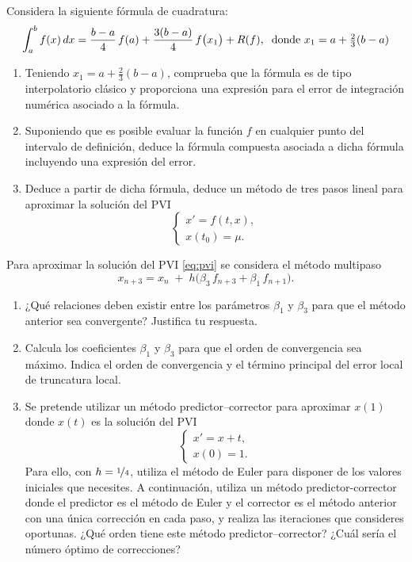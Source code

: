\documentclass[12pt]{article}
\begin{document}
  \begin{ejercicio}[3 puntos] Considera la siguiente fórmula de cuadratura:
    \[
      \int_a^b f(x)\,dx
      = \frac{b-a}{4}\,f(a)
      + \frac{3(b-a)}{4}\,f\bigl(x_1\bigr)
      + R(f), \hspace{0.2cm} \text{donde } x_1 = a+\tfrac{2}{3}(b-a)
    \]
    \begin{enumerate}
      \item Teniendo $x_1 = a+\tfrac{2}{3}(b-a)$, comprueba que la fórmula es de tipo interpolatorio clásico y proporciona una expresión para el error de integración numérica asociado a la fórmula.
      \item Suponiendo que es posible evaluar la función \(f\) en cualquier punto del intervalo de definición, deduce la fórmula compuesta asociada
      a dicha fórmula incluyendo una expresión del error.
      \item Deduce a partir de dicha fórmula, deduce un método de tres pasos lineal para aproximar la solución del PVI
      \begin{equation}
        \begin{cases}
          x' = f(t,x),\\
          x(t_0)=\mu.
        \end{cases}
        \label{eq:pvi}
      \end{equation}
    \end{enumerate}
  
\end{ejercicio}
\begin{ejercicio}[2 puntos] Para aproximar la solución del PVI \eqref{eq:pvi} se considera el método multipaso
    \[
      x_{n+3} = x_n \;+\; h\bigl(\beta_3\,f_{n+3} + \beta_1\,f_{n+1}\bigr).
    \]
    \begin{enumerate}
      \item ¿Qué relaciones deben existir entre los parámetros $\beta_1$ y $\beta_3$ para que el método anterior sea convergente? Justifica tu respuesta.
      \item Calcula los coeficientes \(\beta_1\) y \(\beta_3\) para que el orden de convergencia sea máximo. Indica el orden de convergencia y 
      el término principal del error local de truncatura local.
      \item Se pretende utilizar un método predictor–corrector para aproximar $x(1)$ donde $x(t)$ es la solución del PVI
      \[
        \begin{cases}
          x' = x + t,\\
          x(0)=1.
        \end{cases}
      \]
      Para ello, con \(h=\nicefrac{1}{4}\), utiliza el método de Euler para disponer de los valores iniciales que necesites. 
      A continuación, utiliza un método predictor-corrector donde el predictor es el método de Euler y el corrector es el método anterior
      con una única corrección en cada paso, y realiza las iteraciones que consideres oportunas. ¿Qué orden tiene este método predictor–corrector? 
      ¿Cuál sería el número óptimo de correcciones?
    \end{enumerate}
\end{ejercicio}
\end{document}
